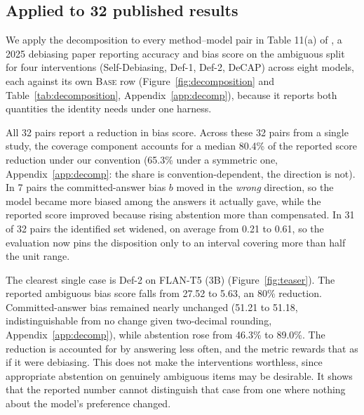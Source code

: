 \subsection{Applied to 32 published results}


We apply the decomposition to every method--model pair in Table 11(a) of
\citet{bae2025decap}, a 2025 debiasing paper reporting accuracy and bias score
on the ambiguous split for four interventions (Self-Debiasing, Def-1, Def-2,
DeCAP) across eight models, each against its own \textsc{Base} row
(Figure~\ref{fig:decomposition} and Table~\ref{tab:decomposition},
Appendix~\ref{app:decomp}), because it reports both quantities the identity
needs under one harness.

All 32 pairs report a reduction in bias score. Across these 32 pairs from a
single study, the coverage component accounts for a median 80.4\% of the
reported score reduction under our convention (65.3\% under a symmetric one,
Appendix~\ref{app:decomp}: the share is convention-dependent, the direction
is not). In 7
pairs the committed-answer bias $b$ moved in the \emph{wrong} direction, so the
model became more biased among the answers it actually gave, while the
reported score improved because rising abstention more than compensated. In 31
of 32 pairs the identified set widened, on average from 0.21 to 0.61, so the
evaluation now pins the disposition only to an interval covering more than half
the unit range.

The clearest single case is Def-2 on FLAN-T5 (3B) (Figure~\ref{fig:teaser}). The reported ambiguous
bias score falls from 27.52 to 5.63, an 80\% reduction. Committed-answer
bias remained nearly unchanged (51.21 to 51.18, indistinguishable from no
change given two-decimal rounding, Appendix~\ref{app:decomp}), while abstention
rose from 46.3\% to 89.0\%. The reduction is accounted for by answering less
often, and the metric rewards that as if it were debiasing. This does not make the interventions worthless, since
appropriate abstention on genuinely ambiguous items may be desirable. It shows
that the reported number cannot distinguish that case from one where nothing
about the model's preference changed.
